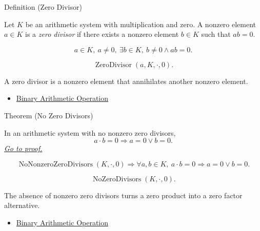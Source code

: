 \begin{definitionbox}{Definition (Zero Divisor)}
\begin{definition}
\label{def:zero-divisor}
Let $K$ be an arithmetic system with multiplication and zero. A nonzero
element $a\in K$ is a \emph{zero divisor} if there exists a nonzero element
$b\in K$ such that $ab=0$.
\end{definition}
\end{definitionbox}

\begin{remark*}
\[
a\in K,\ a\ne 0,\ \exists b\in K,\ b\ne 0 \land ab=0.
\]
\end{remark*}

\begin{remark*}
\[
\operatorname{ZeroDivisor}(a,K,\cdot,0).
\]
\end{remark*}

\begin{remark*}[Interpretation]
A zero divisor is a nonzero element that annihilates another nonzero element.
\end{remark*}

\begin{dependencies}
\begin{itemize}
  \item \hyperref[def:binary-arithmetic-operation]{Binary Arithmetic Operation}
\end{itemize}
\end{dependencies}

\begin{theorembox}{Theorem (No Zero Divisors)}
\begin{theorem}
\label{thm:no-zero-divisors}
In an arithmetic system with no nonzero zero divisors,
\[
a\cdot b=0 \Longrightarrow a=0 \lor b=0.
\]
\hyperref[prf:no-zero-divisors]{\textit{Go to proof.}}
\end{theorem}
\end{theorembox}

\begin{remark*}
\[
\operatorname{NoNonzeroZeroDivisors}(K,\cdot,0)
\Longrightarrow
\forall a,b\in K,\ a\cdot b=0 \Rightarrow a=0 \lor b=0.
\]
\end{remark*}

\begin{remark*}
\[
\operatorname{NoZeroDivisors}(K,\cdot,0).
\]
\end{remark*}

\begin{remark*}[Interpretation]
The absence of nonzero zero divisors turns a zero product into a zero factor
alternative.
\end{remark*}

\begin{dependencies}
\begin{itemize}
  \item \hyperref[def:binary-arithmetic-operation]{Binary Arithmetic Operation}
\end{itemize}
\end{dependencies}
